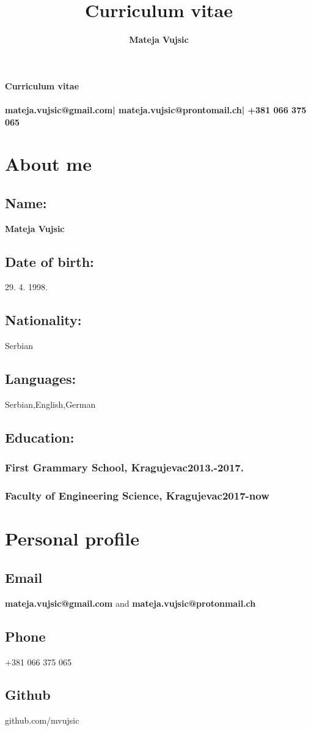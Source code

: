 \documentclass[10pt]{article}
\title{Curriculum vitae}
\author{\textbf{Mateja Vujsic}}
\makeatletter
\renewcommand{\maketitle}{
	\begin{center}
	{\Large\textbf{Curriculum vitae}}\\
	\vspace{.62em}
	{\huge\bfseries\theauthor}\\
	\vspace{.62em}
	{\bfseries{mateja.vujsic@gmail.com| mateja.vujsic@prontomail.ch| +381 066 375 065}}
	\end{center}
}
\makeatother
\begin{document}
\maketitle

\section{About me}
\subsection{\large{Name:}}
\textbf{\large{Mateja Vujsic}}
\subsection{\large{Date of birth:}}
\large{29. 4. 1998.}
\subsection{\large{Nationality:}}
\large{Serbian}
\subsection{\large{Languages:}}
\large{Serbian,English,German}
\subsection{\large{Education:}}
\subsubsection{First Grammary School, Kragujevac\hfill 2013.-2017.}
\subsubsection{Faculty of Engineering Science, Kragujevac\hfill 2017-now}

\section{Personal profile}
\subsection{Email}
\textbf{mateja.vujsic@gmail.com} and \textbf{mateja.vujsic@protonmail.ch}
\subsection{Phone}
+381 066 375 065
\subsection{Github}
github.com/mvujsic
\end{document}
